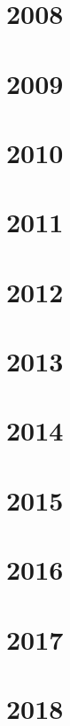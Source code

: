 
\section{2008}
\section{2009}
\section{2010}
\section{2011}
\section{2012}
\section{2013}
\section{2014}
\section{2015}
\section{2016}

\section{2017}
\section{2018}